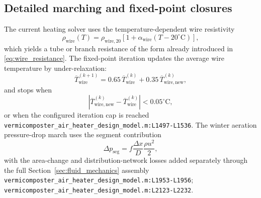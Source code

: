 \documentclass[11pt]{article}
\newcommand{\srcref}[1]{\nolinkurl{#1}}
\begin{document}
\subsection*{Detailed marching and fixed-point closures}
The current heating solver uses the temperature-dependent wire resistivity
\begin{equation}
\label{eq:wire_resistivity_temperature}
\rho_{\mathrm{wire}}(T)=\rho_{\mathrm{wire},20}\left[1+\alpha_{\mathrm{wire}}(T-20^\circ\mathrm{C})\right],
\end{equation}
which yields a tube or branch resistance of the form already introduced in \eqref{eq:wire_resistance}. The fixed-point iteration updates the average wire temperature by under-relaxation:
\begin{equation}
\label{eq:wire_underrelaxation}
\overline{T}_{\mathrm{wire}}^{(k+1)}
=0.65\,\overline{T}_{\mathrm{wire}}^{(k)}+0.35\,\overline{T}_{\mathrm{wire,new}}^{(k)},
\end{equation}
and stops when
\begin{equation}
\label{eq:wire_convergence}
\left|\overline{T}_{\mathrm{wire,new}}^{(k)}-\overline{T}_{\mathrm{wire}}^{(k)}\right|<0.05^\circ\mathrm{C},
\end{equation}
or when the configured iteration cap is reached \srcref{vermicomposter_air_heater_design_model.m:L1497-L1536}. The winter aeration pressure-drop march uses the segment contribution
\begin{equation}
\label{eq:segment_pressure_drop}
\Delta p_{\mathrm{seg}}=
f\frac{\Delta x}{D}\frac{\rho u^2}{2},
\end{equation}
with the area-change and distribution-network losses added separately through the full Section~\ref{sec:fluid_mechanics} assembly \srcref{vermicomposter_air_heater_design_model.m:L1953-L1956}; \srcref{vermicomposter_air_heater_design_model.m:L2123-L2232}.
\end{document}

